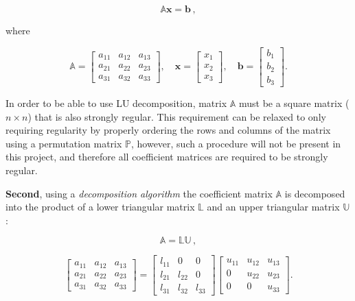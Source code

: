 \begin{equation}\label{Equation:theory-LU-decomposition-system-linear-equations-matrix-form-Axb}
	\mathbb{A}\textbf{x} = \textbf{b}\,,
\end{equation}

where

\begin{equation}
	\mathbb{A} = 
	\begin{bmatrix}
		a_{11} & a_{12} & a_{13} \\
		a_{21} & a_{22} & a_{23} \\
		a_{31} & a_{32} & a_{33}
	\end{bmatrix}
	,\quad
	\mathbf{x} = 
	\begin{bmatrix}
		x_{1} \\
		x_{2} \\
		x_{3}
	\end{bmatrix}
	,\quad
	\mathbf{b} = 
	\begin{bmatrix}
		b_{1} \\
		b_{2} \\
		b_{3}
	\end{bmatrix}.
\end{equation}

In order to be able to use LU decomposition, matrix $ \mathbb{A} $ must be a square matrix ($ n\times n $) that is also strongly regular. This requirement can be relaxed to only requiring regularity by properly ordering the rows and columns of the matrix using a permutation matrix $ \mathbb{P} $, however, such a procedure will not be present in this project, and therefore all coefficient matrices are required to be strongly regular.
\par \textbf{Second}, using a \textit{decomposition algorithm} the coefficient matrix $ \mathbb{A} $ is decomposed into the product of a lower triangular matrix $ \mathbb{L} $ and an upper triangular matrix $ \mathbb{U} $:

\begin{equation}
	\mathbb{A} = \mathbb{LU}\,,
\end{equation}

\begin{equation}
	\begin{bmatrix}
		a_{11} & a_{12} & a_{13} \\
		a_{21} & a_{22} & a_{23} \\
		a_{31} & a_{32} & a_{33}
	\end{bmatrix}
	=
	\begin{bmatrix}
		l_{11} & 0      & 0          \\
		l_{21} & l_{22} & 0          \\
		l_{31} & l_{32} & l_{33}
	\end{bmatrix}
	\begin{bmatrix}
		u_{11} & u_{12} & u_{13} \\
		0      & u_{22} & u_{23} \\
		0      & 0      & u_{33}
	\end{bmatrix}.
\end{equation}

